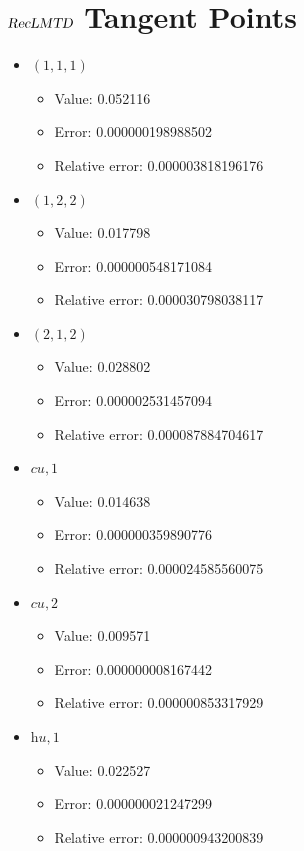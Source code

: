 \documentclass{article}%
\begin{document}
\section{$\textsl{RecLMTD}$ Tangent Points}%
\thispagestyle{plain}%
\begin{itemize}%
	\item $(1, 1, 1)$%
	\begin{itemize}%
		\item Value: 0.052116%
		\item Error: 0.000000198988502%
		\item Relative error: 0.000003818196176%
	\end{itemize}%
	\item $(1, 2, 2)$%
	\begin{itemize}%
		\item Value: 0.017798%
		\item Error: 0.000000548171084%
		\item Relative error: 0.000030798038117%
	\end{itemize}%
	\item $(2, 1, 2)$%
	\begin{itemize}%
		\item Value: 0.028802%
		\item Error: 0.000002531457094%
		\item Relative error: 0.000087884704617%
	\end{itemize}%
	\item $\textit{cu},1$%
	\begin{itemize}%
		\item Value: 0.014638%
		\item Error: 0.000000359890776%
		\item Relative error: 0.000024585560075%
	\end{itemize}%
	\item $\textit{cu},2$%
	\begin{itemize}%
		\item Value: 0.009571%
		\item Error: 0.000000008167442%
		\item Relative error: 0.000000853317929%
	\end{itemize}%
	\item $\textit{hu},1$%
	\begin{itemize}%
		\item Value: 0.022527%
		\item Error: 0.000000021247299%
		\item Relative error: 0.000000943200839%
	\end{itemize}%
\end{itemize}%
\end{document}
